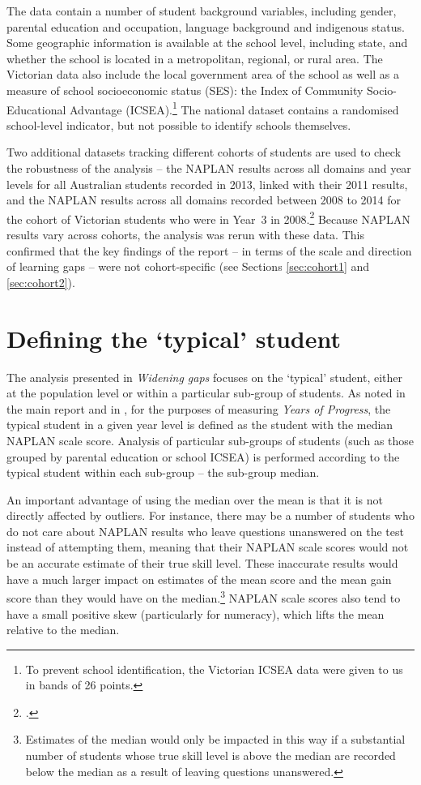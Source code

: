 The data contain a number of student background variables, including gender, parental education and occupation, language background and indigenous status. Some geographic information is available at the school level, including state, and whether the school is located in a metropolitan, regional, or rural area. The Victorian data also include the local government area of the school as well as a measure of school socioeconomic status (SES): the Index of Community Socio-Educational Advantage (ICSEA).\footnote{To prevent school identification, the Victorian ICSEA data were given to us in bands of 26 points.} The national dataset contains a randomised school-level indicator, but not possible to identify schools themselves. 

Two additional datasets tracking different cohorts of students are used to check the robustness of the analysis -- the NAPLAN results across all domains and year levels for all Australian students recorded in 2013, linked with their 2011 results, and the NAPLAN results across all domains recorded between 2008 to 2014 for the cohort of Victorian students who were in \mbox{Year 3} in 2008.\footcite{acara2013,vcaa2014} Because NAPLAN results vary across cohorts, the analysis was rerun with these data. This confirmed that the key findings of the report -- in terms of the scale and direction of learning gaps -- were not cohort-specific (see Sections \ref{sec:cohort1} and \ref{sec:cohort2}).

\section{Defining the `typical' student}

The analysis presented in \textit{Widening gaps} focuses on the `typical' student, either at the population level or within a particular sub-group of students. As noted in the main report and in , for the purposes of measuring \textit{Years of Progress}, the typical student in a given year level is defined as the student with the median NAPLAN scale score. Analysis of particular sub-groups of students (such as those grouped by parental education or school ICSEA) is performed according to the typical student within each sub-group -- the sub-group median.

An important advantage of using the median over the mean is that it is not directly affected by outliers. For instance, there may be a number of students who do not care about NAPLAN results who leave questions unanswered on the test instead of attempting them, meaning that their NAPLAN scale scores would not be an accurate estimate of their true skill level. These inaccurate results would have a much larger impact on estimates of the mean score and the mean gain score than they would have on the median.\footnote{Estimates of the median would only be impacted in this way if a substantial number of students whose true skill level is above the median are recorded below the median as a result of leaving questions unanswered.} NAPLAN scale scores also tend to have a small positive skew (particularly for numeracy), which lifts the mean relative to the median.

